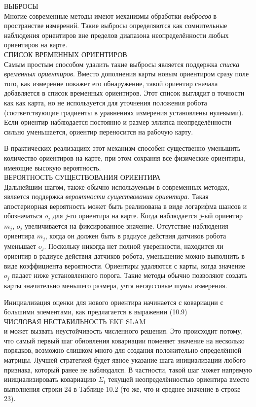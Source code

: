 \documentclass[10pt,a4paper]{article}
\begin{document}
ВЫБРОСЫ\\

Многие современные методы имеют механизмы обработки \textit{выбросов} в пространстве измерений. Такие выбросы определяются как сомнительные наблюдения ориентиров вне пределов диапазона неопределённости любых ориентиров на карте.\\

СПИСОК ВРЕМЕННЫХ ОРИЕНТИРОВ\\ 

Самым простым способом удалить такие выбросы является поддержка \textit{списка временных ориентиров}. Вместо дополнения карты новым ориентиром сразу поле того, как измерение покажет его обнаружение, такой ориентир сначала добавляется в список временных ориентиров. Этот список выглядит в точности как как карта, но не используется для уточнения положения робота (соответствующие градиенты в уравнениях измерения установлены нулевыми). Если ориентир наблюдается постоянно и размер эллипса неопределённости сильно уменьшается, ориентир переносится на рабочую карту. 

В практических реализациях этот механизм способен существенно уменьшить количество ориентиров на карте, при этом сохраняя все физические ориентиры, имеющие высокую вероятность.\\
ВЕРОЯТНОСТЬ СУЩЕСТВОВАНИЯ ОРИЕНТИРА\\
Дальнейшим шагом, также обычно используемым в современных методах, является поддержка \textit{вероятности существования ориентира.} Такая апостериорная вероятность может быть реализована в виде логарифма шансов и обозначаться $o_j$ для $j$-го ориентира на карте. Когда наблюдается $j$-ый ориентир $m_j$, $o_j$ увеличивается на фиксированное значение. Отсутствие наблюдения ориентира $m_j$, когда он должен быть в радиусе действия датчиков робота уменьшает $o_j$. Поскольку никогда нет полной уверенности, находится ли ориентир в радиусе действия датчиков робота, уменьшение можно выполнить в виде коэффициента вероятности. Ориентиры удаляются с карты, когда значение $o_j$ падает ниже установленного порога. Такие методы обычно позволяют создать карты значительно меньшего размера, учтя негауссовые шумы измерения.

Инициализация оценки для нового ориентира начинается с ковариации с большими элементами, как предлагается в выражении (10.9)\\
ЧИСЛОВАЯ НЕСТАБИЛЬНОСТЬ EKF SLAM\\

и может вызвать неустойчивость численного решения. Это происходит потому, что самый первый шаг обновления ковариации поменяет значение на несколько порядков, возможно слишком много для создания положительно определённой матрицы. Лучшей стратегией будет явное указание шага инициализации любого признака, который ранее не наблюдался. В частности, такой шаг может напрямую инициализировать ковариацию $\varSigma_t$  текущей неопределённостью ориентира вместо выполнения строки 24 в Таблице 10.2 (то же, что и среднее значение в строке 23).
\end{document}
